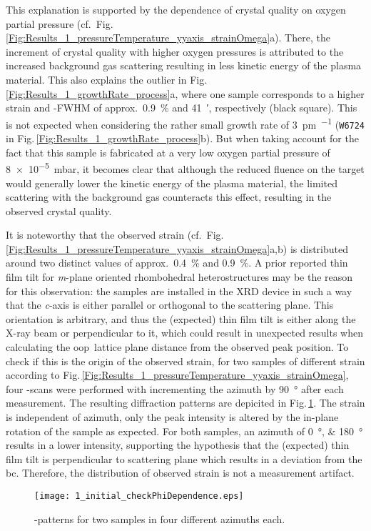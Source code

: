 This explanation is supported by the dependence of crystal quality on oxygen partial pressure (cf.\ Fig.\,\ref{Fig:Results_1_pressureTemperature_yyaxis_strainOmega}a).
There, the increment of crystal quality with higher oxygen pressures is attributed to the increased background gas scattering resulting in less kinetic energy of the plasma material.
This also explains the outlier in Fig.\,\ref{Fig:Results_1_growthRate_process}a, where one sample corresponds to a higher strain and \textomega-FWHM of approx.\ \qty{0.9}{\percent} and \qty{41}{\arcminute}, respectively (black square).
This is not expected when considering the rather small growth rate of \qty{3}{\pm\per\pulse} (\texttt{W6724} in Fig.\,\ref{Fig:Results_1_growthRate_process}b).
But when taking account for the fact that this sample is fabricated at a very low oxygen partial pressure of \qty{8e-5}{\milli\bar}, it becomes clear that although the reduced fluence on the target would generally lower the kinetic energy of the plasma material, the limited scattering with the background gas counteracts this effect, resulting in the observed crystal quality.

It is noteworthy that the observed strain (cf.\ Fig.\,\ref{Fig:Results_1_pressureTemperature_yyaxis_strainOmega}a,b) is distributed around two distinct values of approx.\ \qty{0.4}{\percent} and \qty{0.9}{\percent}.
A prior reported thin film tilt for \textit{m}-plane oriented rhombohedral heterostructures
    \cite{kneiss2021}
may be the reason for this observation:
the samples are installed in the XRD device in such a way that the \textit{c}-axis is either parallel or orthogonal to the scattering plane.
This orientation is arbitrary, and thus the (expected) thin film tilt is either along the X-ray beam or perpendicular to it, which could result in unexpected results when calculating the \gls{oop}\ lattice plane distance from the observed peak position.
To check if this is the origin of the observed strain, for two samples of different strain according to Fig.\,\ref{Fig:Results_1_pressureTemperature_yyaxis_strainOmega}, four \thetaomega-scans were performed with incrementing the azimuth by \qty{90}{\degree} after each measurement.
The resulting diffraction patterns are depicited in Fig.\,\ref{Fig:Results_1_checkPhi}.
The strain is independent of azimuth, only the peak intensity is altered by the in-plane rotation of the sample as expected.
For both samples, an azimuth of \qtylist{0;180}{\degree} results in a lower intensity, supporting the hypothesis that the (expected) thin film tilt is perpendicular to scattering plane which results in a deviation from the \gls{bc}.
Therefore, the distribution of observed strain is not a measurement artifact.
\begin{figure}
    \centering
    \texttt{[image: 1\_initial\_checkPhiDependence.eps]}
    \caption{\thetaomega-patterns for two samples in four different azimuths each.}
    \label{Fig:Results_1_checkPhi}
\end{figure}
